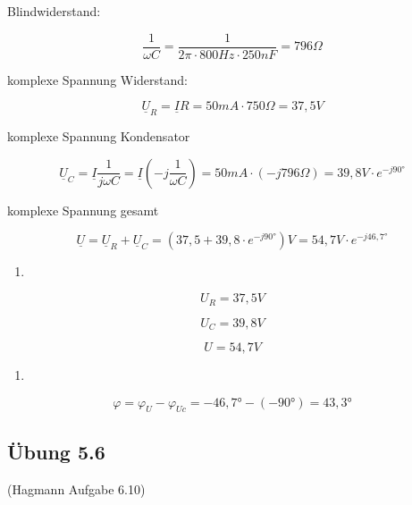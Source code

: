 \documentclass[
  ngerman,
  letterpaper,
]{scrbook}
\providecommand{\tightlist}{%
  \setlength{\itemsep}{0pt}\setlength{\parskip}{0pt}}
\begin{document}
\begin{tcolorbox}[enhanced jigsaw, titlerule=0mm, rightrule=.15mm, toprule=.15mm, colback=white, toptitle=1mm, bottomrule=.15mm, coltitle=black, leftrule=.75mm, arc=.35mm, colbacktitle=quarto-callout-caution-color!10!white, opacityback=0, bottomtitle=1mm, colframe=quarto-callout-caution-color-frame, opacitybacktitle=0.6, breakable, title=\textcolor{quarto-callout-caution-color}{\faFire}\hspace{0.5em}{Lösung 5.5}, left=2mm]

Blindwiderstand:

\[\frac{1}{\omega C} = \frac{1}{2 \pi \cdot 800Hz \cdot 250 nF} = 796 \Omega\]

komplexe Spannung Widerstand:

\[\underline{U}_R = \underline{I} R = 50 mA \cdot 750 \Omega = 37,5V\]

komplexe Spannung Kondensator

\[\underline{U}_C = \underline{I} \frac{1}{j \omega C} = \underline{I} \left( -j \frac{1}{\omega C} \right) = 50 mA \cdot (-j 796 \Omega) = 39,8V \cdot e^{-j 90°}\]

komplexe Spannung gesamt

\[\underline{U} = \underline{U}_R + \underline{U}_C = \left( 37,5 + 39,8 \cdot e^{-j 90°} \right) V = 54,7V \cdot e^{-j46,7°}\]

\begin{enumerate}
\def\labelenumi{\alph{enumi})}
\tightlist
\item
\end{enumerate}

\[U_R = 37,5V\]

\[U_C = 39,8V\]

\[U = 54,7V\]

\begin{enumerate}
\def\labelenumi{\alph{enumi})}
\setcounter{enumi}{1}
\tightlist
\item
\end{enumerate}

\[\varphi = \varphi_U - \varphi_{Uc} = -46,7° - (-90°) = 43,3°\]

\end{tcolorbox}

\subsection{Übung 5.6}\label{uxfcbung-5.6}

(Hagmann Aufgabe 6.10)
\end{document}
